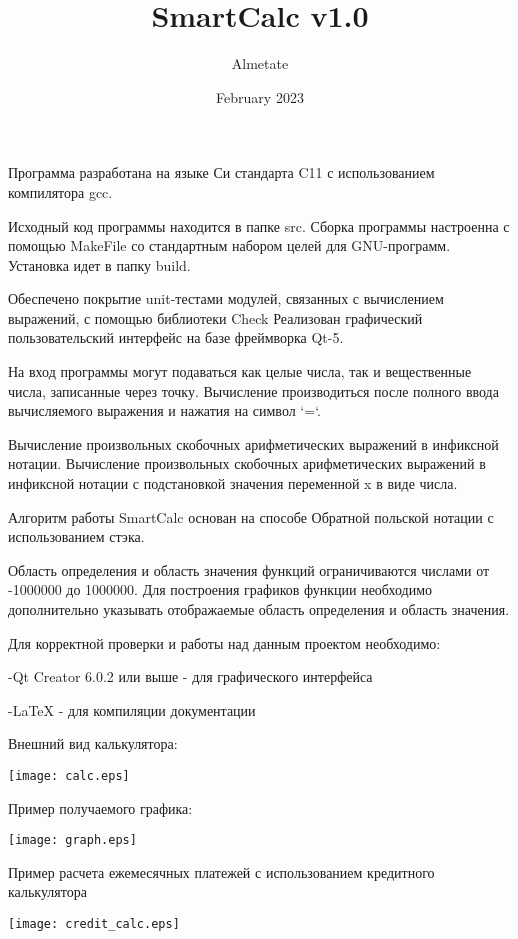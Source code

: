 \documentclass[12pt, letterpaper]{article}
\title{SmartCalc v1.0}
\author{Almetate}
\date{February 2023}
\begin{document}
\maketitle

Программа разработана на языке Си стандарта C11 с использованием компилятора gcc.

Исходный код программы находится в папке src.
Сборка программы настроенна с помощью MakeFile со стандартным набором целей для GNU-программ. Установка идет в папку build.

Обеспечено покрытие unit-тестами модулей, связанных с вычислением выражений, с помощью библиотеки Check
Реализован графический пользовательский интерфейс на базе фреймворка Qt-5.

На вход программы могут подаваться как целые числа, так и вещественные числа, записанные через точку. Вычисление производиться после полного ввода вычисляемого выражения и нажатия на символ `=`.

Вычисление произвольных скобочных арифметических выражений в инфиксной нотации.
Вычисление произвольных скобочных арифметических выражений в инфиксной нотации с подстановкой значения переменной x в виде числа.

Алгоритм работы SmartCalc основан на способе Обратной польской нотации с использованием стэка.

Область определения и область значения функций ограничиваются числами от -1000000 до 1000000.
Для построения графиков функции необходимо дополнительно указывать отображаемые область определения и область значения.

Для корректной проверки и работы над данным проектом необходимо:

-Qt Creator 6.0.2 или выше - для графического интерфейса

-LaTeX - для компиляции документации

Внешний вид калькулятора:
  
\texttt{[image: calc.eps]}

Пример получаемого графика:

\texttt{[image: graph.eps]}

Пример расчета ежемесячных платежей с использованием кредитного калькулятора

\texttt{[image: credit\_calc.eps]}
\end{document}
